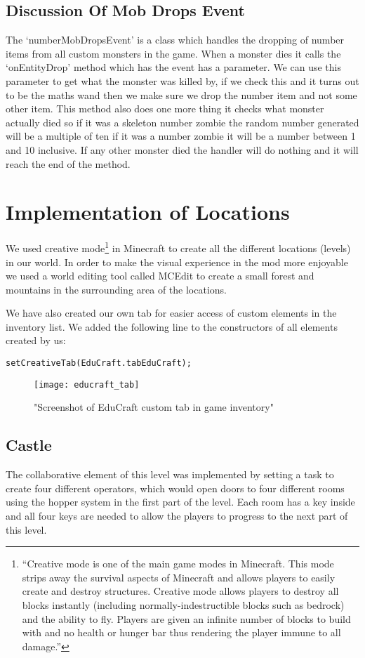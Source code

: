 \subsection{Discussion Of Mob Drops Event}
The ‘numberMobDropsEvent’ is a class which handles the dropping of number items from all custom monsters in the game. When a monster dies it calls the ‘onEntityDrop’ method which has the event has a parameter. We can use this parameter to get what the monster was killed by, if we check this and it turns out to be the maths wand then we make sure we drop the number item and not some other item. This method also does one more thing it checks what monster actually died so if it was a skeleton number zombie the random number generated will be a multiple of ten if it was a number zombie it will be a number between 1 and 10 inclusive. If any other monster died the handler will do nothing and it will reach the end of the method.

\section{Implementation of Locations}
We used creative mode\footnote{``Creative mode is one of the main game modes in Minecraft. This mode strips away the survival aspects of Minecraft and allows players to easily create and destroy structures. Creative mode allows players to destroy all blocks instantly (including normally-indestructible blocks such as bedrock) and the ability to fly. Players are given an infinite number of blocks to build with and no health or hunger bar thus rendering the player immune to all damage.''\cite{website:minecraft-creative}} in Minecraft to create all the different locations (levels) in our world. In order to make the visual experience in the mod more enjoyable we used a world editing tool called MCEdit to create a small forest and mountains in the surrounding area of the locations.

We have also created our own tab for easier access of custom elements in the inventory list. We added the following line to the constructors of all elements created by us:
\begin{lstlisting}
setCreativeTab(EduCraft.tabEduCraft);
\end{lstlisting}
\begin{figure}[h!]
\centering
\texttt{[image: educraft\_tab]}
\caption{"Screenshot of EduCraft custom tab in game inventory"}
\end{figure}

\subsection{Castle}
The collaborative element of this level was implemented by setting a task to create four different operators, which would open doors to four different rooms using the hopper system in the first part of the level. Each room has a key inside and all four keys are needed to allow the players to progress to the next part of this level.

